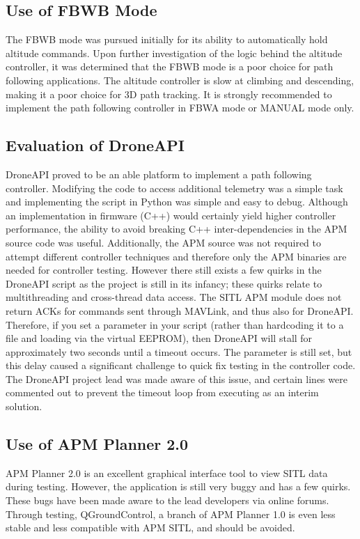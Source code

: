 \documentclass{aiaa}
\begin{document}
\subsection{Use of FBWB Mode}
The FBWB mode was pursued initially for its ability to automatically hold altitude commands. Upon further investigation of the logic behind the altitude controller, it was determined that the FBWB mode is a poor choice for path following applications. The altitude controller is slow at climbing and descending, making it a poor choice for 3D path tracking.  It is strongly recommended to implement the path following controller in FBWA mode or MANUAL mode only.

\subsection{Evaluation of DroneAPI}
DroneAPI proved to be an able platform to implement a path following controller. Modifying the code to access additional telemetry was a simple task and implementing the script in Python was simple and easy to debug. Although an implementation in firmware (C++) would certainly yield higher controller performance, the ability to avoid breaking C++ inter-dependencies in the APM source code was useful. Additionally, the APM source was not required to attempt different controller techniques and therefore only the APM binaries are needed for controller testing. However there still exists a few quirks in the DroneAPI script as the project is still in its infancy; these quirks relate to multithreading and cross-thread data access. The SITL APM module does not return ACKs for commands sent through MAVLink, and thus also for DroneAPI. Therefore, if you set a parameter in your script (rather than hardcoding it to a file and loading via the virtual EEPROM), then DroneAPI will stall for approximately two seconds until a timeout occurs. The parameter is still set, but this delay caused a significant challenge to quick fix testing in the controller code. The DroneAPI project lead was made aware of this issue, and certain lines were commented out to prevent the timeout loop from executing as an interim solution.

\subsection{Use of APM Planner 2.0}
APM Planner 2.0 is an excellent graphical interface tool to view SITL data during testing. However, the application is still very buggy and has a few quirks. These bugs have been made aware to the lead developers via online forums. Through testing, QGroundControl, a branch of APM Planner 1.0 is even less stable and less compatible with APM SITL, and should be avoided.
\end{document}
